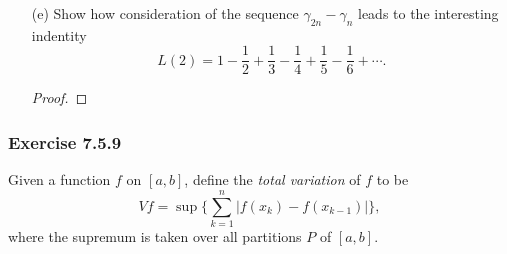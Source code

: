 \begin{enumerate}
\begin{proof}
		\end{proof}
	\item[(e)] Show how consideration of the sequence \( \gamma_{2n} - \gamma_{n}    \) leads to the interesting indentity 
		\[  L(2) = 1 - \frac{ 1 }{ 2 } + \frac{ 1 }{ 3 } - \frac{ 1 }{ 4 } + \frac{ 1 }{ 5 } - \frac{ 1 }{ 6 } + \dotsb.  \]
		\begin{proof}
		
		\end{proof}
\end{enumerate}



\subsubsection{Exercise 7.5.9} Given a function \( f  \) on \( [a,b]  \), define the \textit{total variation} of \( f  \) to be 
\[  Vf = \sup \Bigg\{ \sum_{ k=1 }^{ n } | f(x_{k}) - f(x_{k-1}) |  \Bigg\},  \]
where the supremum is taken over all partitions \( P  \) of \( [a,b] \).
